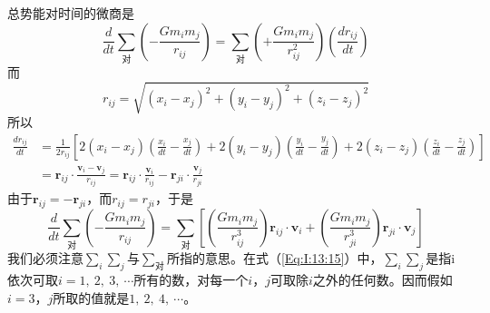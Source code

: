总势能对时间的微商是
\begin{equation*}
    \frac{d}{dt} \sum_{\text{对}} (-\frac{Gm_im_j}{r_{ij}}) = \sum_{\text{对}} (+\frac{Gm_im_j}{r_{ij}^2}) (\frac{dr_{ij}}{dt}) 
\end{equation*}
而
\begin{equation*}
    r_{ij} = \sqrt{(x_i - x_j)^2 + (y_i - y_j)^2 + (z_i - z_j)^2}
\end{equation*}
所以
\begin{equation*}
    \begin{aligned}
        \frac{dr_{ij}}{dt}&=\frac{1}{2r_{ij}}[2(x_i - x_j)(\frac{x_i}{dt} - \frac{x_j}{dt}) + 2(y_i - y_j)(\frac{y_i}{dt} - \frac{y_j}{dt}) + 2(z_i - z_j)(\frac{z_i}{dt} - \frac{z_j}{dt})] \\
        &=\boldsymbol{r}_{ij} \cdot \frac{\boldsymbol{v}_i - \boldsymbol{v}_j}{r_{ij}}=\boldsymbol{r}_{ij} \cdot \frac{\boldsymbol{v}_i}{r_{ij}} - \boldsymbol{r}_{ji} \cdot \frac{\boldsymbol{v}_j}{r_{ji}}
    \end{aligned}
\end{equation*}
由于$\boldsymbol{r}_{ij} = -\boldsymbol{r}_{ji}$，而$r_{ij}=r_{ji}$，于是
\begin{equation}
    \label{Eq:I:13:16}
    \frac{d}{dt} \sum_{\text{对}} (-\frac{Gm_im_j}{r_{ij}}) = \sum_{\text{对}} [(\frac{Gm_im_j}{r_{ij}^3})\boldsymbol{r}_{ij} \cdot \boldsymbol{v}_{i} + (\frac{Gm_im_j}{r_{ji}^3})\boldsymbol{r}_{ji} \cdot \boldsymbol{v}_{j}]
\end{equation}
我们必须注意$\sum_i{\sum_j}$与$\sum_{\text{对}}$所指的意思。在式（\ref{Eq:I:13:15}）中，$\sum_i{\sum_j}$是指i依次可取$i=1,~2,~3,~ \cdots$所有的数，对每一个$i$，$j$可取除$i$之外的任何数。因而假如$i=3$，$j$所取的值就是$1,~2,~4,~ \cdots$。

